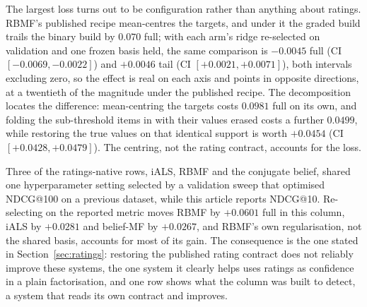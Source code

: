 \documentclass[manuscript,screen]{acmart}
\begin{document}
The largest loss turns out to be configuration rather than anything about ratings. RBMF's published recipe mean-centres the targets, and under it the graded build trails the binary build by $0.070$ full; with each arm's ridge re-selected on validation and one frozen basis held, the same comparison is $-0.0045$ full (CI $[-0.0069,-0.0022]$) and $+0.0046$ tail (CI $[+0.0021,+0.0071]$), both intervals excluding zero, so the effect is real on each axis and points in opposite directions, at a twentieth of the magnitude under the published recipe. The decomposition locates the difference: mean-centring the targets costs $0.0981$ full on its own, and folding the sub-threshold items in with their values erased costs a further $0.0499$, while restoring the true values on that identical support is worth $+0.0454$ (CI $[+0.0428,+0.0479]$). The centring, not the rating contract, accounts for the loss.

Three of the ratings-native rows, iALS, RBMF and the conjugate belief, shared one hyperparameter setting selected by a validation sweep that optimised NDCG@100 on a previous dataset, while this article reports NDCG@10. Re-selecting on the reported metric moves RBMF by $+0.0601$ full in this column, iALS by $+0.0281$ and belief-MF by $+0.0267$, and RBMF's own regularisation, not the shared basis, accounts for most of its gain. The consequence is the one stated in Section~\ref{sec:ratings}: restoring the published rating contract does not reliably improve these systems, the one system it clearly helps uses ratings as confidence in a plain factorisation, and one row shows what the column was built to detect, a system that reads its own contract and improves.
\end{document}
